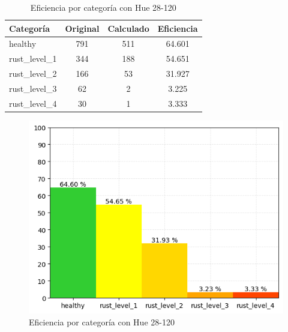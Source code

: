 \captionsetup[figure]{skip=10pt}

\begin{table}[H]
\centering
\begin{tabular}{|l|c|c|c|}
\hline 
\textbf{Categoría} & \textbf{Original} & \textbf{Calculado} & \textbf{Eficiencia} \\
\hline
healthy & 791 & 511 & 64.601 \\
\hline 
rust\_level\_1 & 344 & 188 & 54.651 \\
\hline 
rust\_level\_2 & 166 & 53 & 31.927 \\
\hline 
rust\_level\_3 & 62 & 2 & 3.225 \\
\hline 
rust\_level\_4 & 30 & 1 & 3.333 \\
\hline 
\end{tabular}
\caption{Eficiencia por categoría con Hue 28-120}
\label{table:efficiency_categories_28_120}
\end{table}

\begin{figure}[H]
\centering
\includegraphics[scale=0.6]{images/result_classes_28_120.png}
\caption{Eficiencia por categoría con Hue 28-120}
\label{img:efficiency_categories_28_120}
\end{figure}
